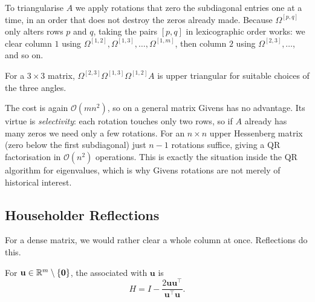\documentclass[a4paper]{scrartcl}
\begin{document}
To triangularise $A$ we apply rotations that zero the subdiagonal entries one at a time, in an order that does not destroy the zeros already made. Because $\Omega^{[p,q]}$ only alters rows $p$ and $q$, taking the pairs $[p,q]$ in lexicographic order works: we clear column $1$ using $\Omega^{[1,2]}, \Omega^{[1,3]}, \dots, \Omega^{[1,m]}$, then column $2$ using $\Omega^{[2,3]}, \dots$, and so on.

\begin{example}
  For a $3\times 3$ matrix, $\Omega^{[2,3]}\Omega^{[1,3]}\Omega^{[1,2]}A$ is upper triangular for suitable choices of the three angles.
\end{example}

The cost is again $\mathcal{O}(mn^2)$, so on a general matrix Givens has no advantage. Its virtue is \emph{selectivity}: each rotation touches only two rows, so if $A$ already has many zeros we need only a few rotations. For an $n\times n$ upper Hessenberg matrix (zero below the first subdiagonal) just $n-1$ rotations suffice, giving a QR factorisation in $\mathcal{O}(n^2)$ operations. This is exactly the situation inside the QR algorithm for eigenvalues, which is why Givens rotations are not merely of historical interest.

\subsection{Householder Reflections}

For a dense matrix, we would rather clear a whole column at once. Reflections do this.

\begin{definition}
  For $\mathbf{u}\in\mathbb{R}^m\setminus\{\mathbf{0}\}$, the  associated with $\mathbf{u}$ is
  $$
  H = I - \frac{2\mathbf{u}\mathbf{u}^\top}{\mathbf{u}^\top\mathbf{u}}.
  $$
\end{definition}
\end{document}
